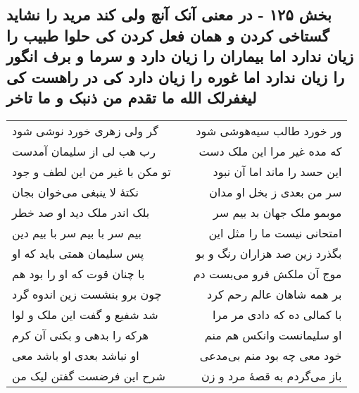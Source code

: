 \begin{center}
\section*{بخش ۱۲۵ - در معنی آنک آنچ ولی کند مرید را نشاید گستاخی کردن و همان فعل کردن کی حلوا طبیب را زیان ندارد اما بیماران را زیان دارد و سرما و برف انگور را زیان ندارد اما غوره را زیان دارد کی در راهست کی لیغفرلک الله ما تقدم من ذنبک و ما تاخر}
\label{sec:sh125}
\begin{longtable}{l p{0.5cm} r}
گر ولی زهری خورد نوشی شود
&&
ور خورد طالب سیه‌هوشی شود
\\
رب هب لی از سلیمان آمدست
&&
که مده غیر مرا این ملک دست
\\
تو مکن با غیر من این لطف و جود
&&
این حسد را ماند اما آن نبود
\\
نکتهٔ لا ینبغی می‌خوان بجان
&&
سر من بعدی ز بخل او مدان
\\
بلک اندر ملک دید او صد خطر
&&
موبمو ملک جهان بد بیم سر
\\
بیم سر با بیم سر با بیم دین
&&
امتحانی نیست ما را مثل این
\\
پس سلیمان همتی باید که او
&&
بگذرد زین صد هزاران رنگ و بو
\\
با چنان قوت که او را بود هم
&&
موج آن ملکش فرو می‌بست دم
\\
چون برو بنشست زین اندوه گرد
&&
بر همه شاهان عالم رحم کرد
\\
شد شفیع و گفت این ملک و لوا
&&
با کمالی ده که دادی مر مرا
\\
هرکه را بدهی و بکنی آن کرم
&&
او سلیمانست وانکس هم منم
\\
او نباشد بعدی او باشد معی
&&
خود معی چه بود منم بی‌مدعی
\\
شرح این فرضست گفتن لیک من
&&
باز می‌گردم به قصهٔ مرد و زن
\\
\end{longtable}
\end{center}
